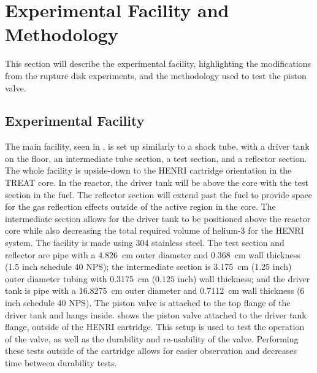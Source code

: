 \section{Experimental Facility and Methodology} \label{s:experiment}

This section will describe the experimental facility, highlighting the modifications from the rupture disk experiments, and the methodology used to test the piston valve.



\subsection{Experimental Facility} \label{ss:facility}

The main facility, seen in , is set up similarly to a shock tube, with a driver tank on the floor, an intermediate tube section, a test section, and a reflector section. The whole facility is upside-down to the HENRI cartridge orientation in the TREAT core. In the reactor, the driver tank will be above the core with the test section in the fuel. The reflector section will extend past the fuel to provide space for the gas reflection effects outside of the active region in the core. The intermediate section allows for the driver tank to be positioned above the reactor core while also decreasing the total required volume of helium-3 for the HENRI system. The facility is made using 304 stainless steel. The test section and reflector are pipe with a \SI{4.826}{\centi\meter} outer diameter and \SI{0.368}{\centi\meter} wall thickness (1.5 inch schedule 40 NPS); the intermediate section is \SI{3.175}{\centi\meter} (1.25 inch) outer diameter tubing with \SI{0.3175}{\centi\meter} ($0.125$ inch) wall thickness; and the driver tank is pipe with a \SI{16.8275}{\centi\meter} outer diameter and \SI{0.7112}{\centi\meter} wall thickness (6 inch schedule 40 NPS). The piston valve is attached to the top flange of the driver tank and hangs inside.  shows the piston valve attached to the driver tank flange, outside of the HENRI cartridge. This setup is used to test the operation of the valve, as well as the durability and re-usability of the valve. Performing these tests outside of the cartridge allows for easier observation and decreases time between durability tests.

